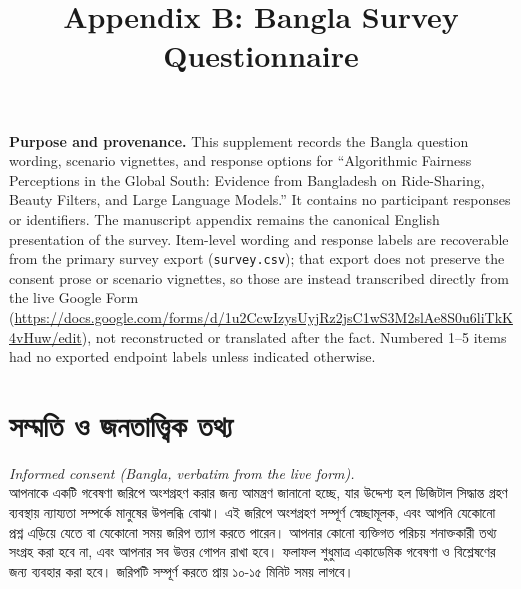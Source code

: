 \documentclass[11pt]{article}
\title{Appendix B: Bangla Survey Questionnaire}
\author{}
\date{}
\newcommand{\bn}[1]{{\bengalifont\upshape #1}}
\begin{document}
\pagestyle{empty}
\maketitle
\thispagestyle{empty}

\noindent\textbf{Purpose and provenance.} This supplement records the Bangla question wording, scenario vignettes, and response options for ``Algorithmic Fairness Perceptions in the Global South: Evidence from Bangladesh on Ride-Sharing, Beauty Filters, and Large Language Models.'' It contains no participant responses or identifiers. The manuscript appendix remains the canonical English presentation of the survey. Item-level wording and response labels are recoverable from the primary survey export (\texttt{survey.csv}); that export does not preserve the consent prose or scenario vignettes, so those are instead transcribed directly from the live Google Form (\url{https://docs.google.com/forms/d/1u2CcwIzysUyjRz2jsC1wS3M2slAe8S0u6liTkK4vHuw/edit}), not reconstructed or translated after the fact. Numbered 1--5 items had no exported endpoint labels unless indicated otherwise.

\section*{\bn{সম্মতি ও জনতাত্ত্বিক তথ্য}}

\noindent\textit{Informed consent (Bangla, verbatim from the live form).}\\
\bn{আপনাকে একটি গবেষণা জরিপে অংশগ্রহণ করার জন্য আমন্ত্রণ জানানো হচ্ছে, যার উদ্দেশ্য হল ডিজিটাল সিদ্ধান্ত গ্রহণ ব্যবস্থায় ন্যায্যতা সম্পর্কে মানুষের উপলব্ধি বোঝা। এই জরিপে অংশগ্রহণ সম্পূর্ণ স্বেচ্ছামূলক, এবং আপনি যেকোনো প্রশ্ন এড়িয়ে যেতে বা যেকোনো সময় জরিপ ত্যাগ করতে পারেন। আপনার কোনো ব্যক্তিগত পরিচয় শনাক্তকারী তথ্য সংগ্রহ করা হবে না, এবং আপনার সব উত্তর গোপন রাখা হবে। ফলাফল শুধুমাত্র একাডেমিক গবেষণা ও বিশ্লেষণের জন্য ব্যবহার করা হবে। জরিপটি সম্পূর্ণ করতে প্রায় ১০-১৫ মিনিট সময় লাগবে।}
\end{document}
